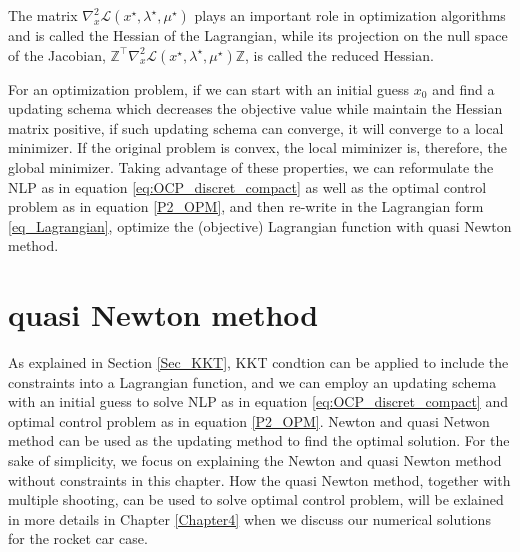 \documentclass  [
  paper    = a4,
  BCOR     = 10mm,
  twoside,
  fontsize = 12pt,
  fleqn,
  toc      = bibnumbered,
  toc      = listofnumbered,
  numbers  = noendperiod,
  headings = normal,
  listof   = leveldown,
  version  = 3.03
]                                       {scrreprt}
\newcommand{\<}{\langle}
\renewcommand{\>}{\rangle}
\begin{document}
The matrix $\nabla_x^2 \mathcal{L}(x^\star, \lambda^\star, \mu^\star)$ plays an important role in optimization algorithms and is called the Hessian of the Lagrangian, while its projection on the null space of the Jacobian, $\mathbb{Z}^\top \nabla_x^2 \mathcal{L}(x^\star, \lambda^\star, \mu^\star)\mathbb{Z}$, is called the reduced Hessian. 

For an optimization problem, if we can start with an initial guess $x_0$ and find a updating schema which decreases the objective value while maintain the Hessian matrix positive, if such updating schema can converge, it will converge to a local minimizer. If the original problem is convex, the local miminizer is, therefore, the global minimizer. Taking advantage of these properties, we can reformulate the NLP as in equation \ref{eq:OCP_discret_compact} as well as the optimal control problem as in equation \ref{P2_OPM}, and then re-write in the Lagrangian form \ref{eq_Lagrangian}, optimize the (objective) Lagrangian function with quasi Newton method. 




\section{quasi Newton method}

As explained in Section \ref{Sec_KKT}, KKT condtion can be applied to include the constraints into a Lagrangian function, and we can employ an updating schema with an initial guess to solve NLP as in equation \ref{eq:OCP_discret_compact} and optimal control problem as in equation \ref{P2_OPM}. Newton and quasi Netwon method can be used as the updating method to find the optimal solution. 
For the sake of simplicity, we focus on explaining the Newton and quasi Newton method without constraints in this chapter. How the quasi Newton method, together with multiple shooting, can be used to solve optimal control problem, will be exlained in more details in Chapter \ref{Chapter4} when we discuss our numerical solutions for the rocket car case. 
\end{document}
